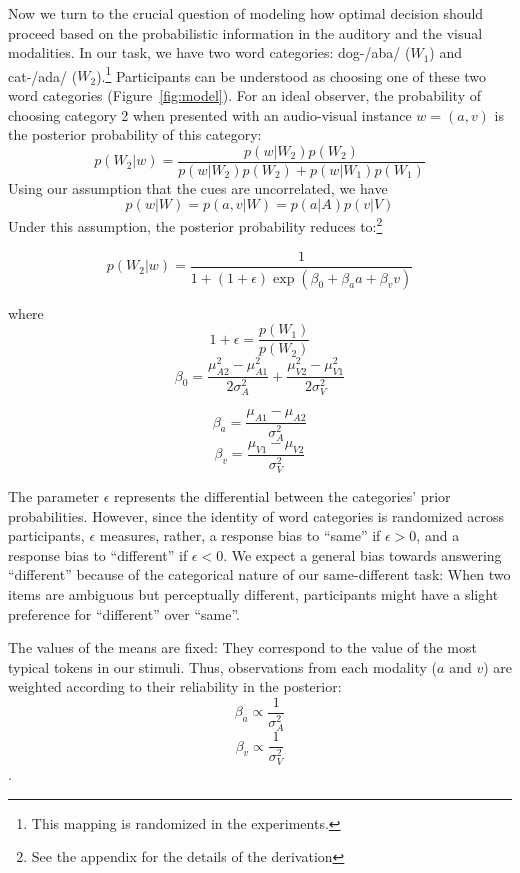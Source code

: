 \documentclass[english,man]{apa6}
\theoremstyle{definition}
\theoremstyle{definition}
\theoremstyle{definition}
\theoremstyle{remark}
\begin{document}
Now we turn to the crucial question of modeling how optimal decision
should proceed based on the probabilistic information in the auditory
and the visual modalities. In our task, we have two word categories:
dog-/aba/ (\(W_1\)) and cat-/ada/
(\(W_2\)).\footnote{This mapping is randomized in the experiments.}
Participants can be understood as choosing one of these two word
categories (Figure~\ref{fig:model}). For an ideal observer, the
probability of choosing category 2 when presented with an audio-visual
instance \(w=(a,v)\) is the posterior probability of this category: \[
p(W_2 | w)=\frac{p(w|W_2)p(W_2)}{p(w|W_2)p(W_2)+p(w|W_1)p(W_1)}
\] Using our assumption that the cues are uncorrelated, we have
\[p(w | W) = p(a,v| W) = p(a| A)p(v| V)\] Under this assumption, the
posterior probability reduces
to:\footnote{See the appendix for the details of the derivation}

\begin{equation}
 p(W_2 | w)=\frac{1}{1+(1+\epsilon)\exp(\beta_0+\beta_aa+\beta_vv)}
\end{equation}

where \[1+\epsilon=\frac{p(W_1)}{p(W_2)}\]
\[\beta_0=\frac{\mu^2_{A2}-\mu^2_{A1}}{2\sigma^2_{A}}+\frac{\mu^2_{V2}-\mu^2_{V1}}{2\sigma^2_{V}}\]

\[\beta_a=\frac{\mu_{A1}-\mu_{A2}}{\sigma^2_{A}}\]
\[\beta_v=\frac{\mu_{V1}-\mu_{V2}}{\sigma^2_{V}}\]

The parameter \(\epsilon\) represents the differential between the
categories' prior probabilities. However, since the identity of word
categories is randomized across participants, \(\epsilon\) measures,
rather, a response bias to \enquote{same} if \(\epsilon > 0\), and a
response bias to \enquote{different} if \(\epsilon < 0\). We expect a
general bias towards answering \enquote{different} because of the
categorical nature of our same-different task: When two items are
ambiguous but perceptually different, participants might have a slight
preference for \enquote{different} over \enquote{same}.

The values of the means are fixed: They correspond to the value of the
most typical tokens in our stimuli. Thus, observations from each
modality (\(a\) and \(v\)) are weighted according to their reliability
in the posterior: \[\beta_a \propto \frac{1}{\sigma^2_{A}}\]
\[\beta_v \propto \frac{1}{\sigma^2_{V}}\].
\end{document}
